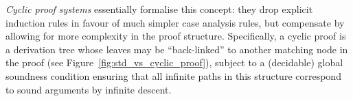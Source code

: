 \documentclass[11pt,twocolumn]{article}
\begin{document}
\emph{Cyclic proof systems} essentially formalise this concept: they drop explicit induction rules in favour of much simpler case analysis rules, but compensate by allowing for more complexity in the proof structure.  Specifically, a cyclic proof is a derivation tree whose leaves may be ``back-linked'' to another matching node in the proof (see Figure~\ref{fig:std_vs_cyclic_proof}), subject to a (decidable) global soundness condition ensuring that all infinite paths in this structure correspond to sound arguments by infinite descent.


%
%
\end{document}
